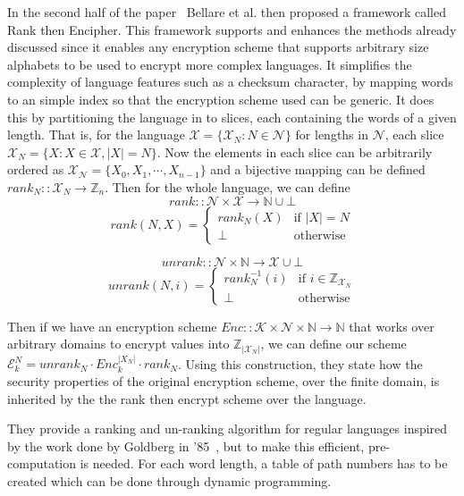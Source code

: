 \documentclass[ %
                    author={Samuel Russell},
                supervisor={Prof. Bogdan Warinschi},
                    degree={MEng},
                     title={Innocuous Ciphertexts},
                  subtitle={The DE-CENSOR Scheme},
                      type={research},
                      year={2018} ]{dissertation}
\begin{document}
In the second half of the paper~\cite{fpe} Bellare et al. then proposed a framework called Rank then Encipher. This framework supports and enhances the methods already discussed since it enables any encryption scheme that supports arbitrary size alphabets to be used to encrypt more complex languages. It simplifies the complexity of language features such as a checksum character, by mapping words to an simple index so that the encryption scheme used can be generic. It does this by partitioning the language in to slices, each containing the words of a given length. That is, for the language $\mathcal{X} = \{\mathcal{X}_N : N \in \mathcal{N} \}$ for lengths in $\mathcal{N}$, each slice $\mathcal{X}_N = \{ X : X \in \mathcal{X}, \vert X \vert = N  \}$. Now the elements in each slice can be arbitrarily ordered as $\mathcal{X_N} = \{ X_0, X_1, \cdots , X_{n-1} \} $ and a bijective mapping can be defined $rank_N :: \mathcal{X}_N \rightarrow \mathbb{Z}_n$.
Then for the whole language, we can define
$$ rank :: \mathcal{N} \times \mathcal{X} \rightarrow \mathbb{N} \cup \bot $$
$$ rank(N,X) =
\left\{
	\begin{array}{ll}
		rank_N(X)  & \mbox{if } \vert X \vert = N\\
		\bot & \mbox{otherwise} 
	\end{array}
\right.
$$

$$ unrank :: \mathcal{N} \times \mathbb{N} \rightarrow \mathcal{X} \cup \bot $$
$$ unrank(N,i) =
\left\{
	\begin{array}{ll}
		rank_N^{-1}(i)  & \mbox{if } i \in \mathbb{Z}_{\mathcal{X}_N}\\
		\bot & \mbox{otherwise} 
	\end{array}
\right.
$$

Then if we have an encryption scheme $Enc :: \mathcal{K} \times \mathcal{N} \times \mathbb{N} \rightarrow \mathbb{N}$ that works over arbitrary domains to encrypt values into $\mathbb{Z}_{|\mathcal{X}_N|}$, we can define our scheme $\mathcal{E}_k^N = unrank_N \cdot Enc_k^{|X_N|} \cdot rank_N$. Using this construction, they state how the security properties of the original encryption scheme, over the finite domain, is inherited by the the rank then encrypt scheme over the language.

They provide a ranking and un-ranking algorithm for regular languages inspired by the work done by Goldberg in '85~\cite{rank}, but to make this efficient, pre-computation is needed. For each word length, a table of path numbers has to be created which can be done through dynamic programming.
\end{document}

